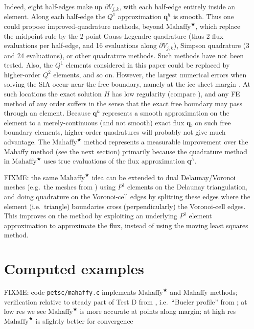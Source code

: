 \documentclass[twocolumn]{igs}
\newcommand\bq{\mathbf{q}}
\newcommand{\Mstar}{$\text{Mahaffy}^{\bigstar}$\xspace}
\begin{document}
Indeed, eight half-edges make up $\partial V_{j,k}$, with each half-edge entirely inside an element.  Along each half-edge the $Q^1$ approximation $\bq^h$ is smooth.  Thus one could propose improved-quadrature methods, beyond \Mstar, which replace the midpoint rule by the 2-point Gauss-Legendre quadrature (thus 2 flux evaluations per half-edge, and 16 evaluations along $\partial V_{j,k}$), Simpson quadrature (3 and 24 evaluations), or other quadrature methods.  Such methods have not been tested.  Also, the $Q^1$ elements considered in this paper could be replaced by higher-order $Q^2$ elements, and so on.  However, the largest numerical errors when solving the SIA occur near the free boundary, namely at the ice sheet margin \cite{Bueleretal2005}.  At such locations the exact solution $H$ has low regularity (compare \cite{JouvetBueler2012}), and any FE method of any order suffers in the sense that the exact free boundary may pass through an element.  Because $\bq^h$ represents a smooth approximation on the element to a merely-continuous (and not smooth) exact flux $\bq$, on such free boundary elements, higher-order quadratures will probably not give much advantage.  The \Mstar method represents a measurable improvement over the Mahaffy method (see the next section) primarily because the quadrature method in \Mstar uses true evaluations of the flux approximation $\bq^h$.

FIXME: the same \Mstar idea can be extended to dual Delaunay/Voronoi meshes (e.g.~the meshes from \cite{EgholmNielsen2010,Ringleretal2013}) using $P^1$ elements on the Delaunay triangulation, and doing quadrature on the Voronoi-cell edges by splitting these edges where the element (i.e.~triangle) boundaries cross (perpendicularly) the Voronoi-cell edges.  This improves on the \cite{EgholmNielsen2010} method by exploiting an underlying $P^1$ element approximation to approximate the flux, instead of using the moving least squares method.


\section{Computed examples} \label{sec:examples}

FIXME: code \texttt{petsc/mahaffy.c} implements \Mstar and Mahaffy methods; verification relative to steady part of Test D from \cite{Bueleretal2005}, i.e.~``Bueler profile'' from \cite{vanderVeen2013}; at low res we see \Mstar is more accurate at points along margin; at high res \Mstar is slightly better for convergence
\end{document}
